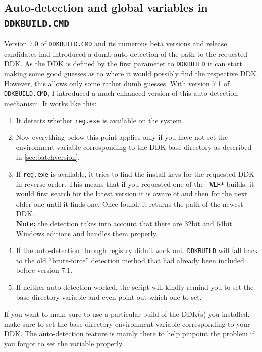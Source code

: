 \documentclass[a4paper,titlepage]{report}
\begin{document}
\subsection{Auto-detection and global variables in \texttt{DDKBUILD.CMD}}
Version 7.0 of \texttt{DDKBUILD.CMD} and its numerous beta versions and release candidates
had introduced a dumb auto-detection of the path to the requested DDK. As the DDK is
defined by the first parameter to \texttt{DDKBUILD} it can start making some good guesses
as to where it would possibly find the respective DDK. However, this allows only some
rather dumb guesses. With version 7.1 of \texttt{DDKBUILD.CMD}, I introduced a much enhanced
version of this auto-detection mechanism. It works like this:
\begin{enumerate}
  \item It detects whether \texttt{reg.exe} is available on the system.
  \item Now everything below this point applies only if you have not set the environment
        variable corresponding to the DDK base directory as described in \autoref{sec:batchversion}.
  \item If \texttt{reg.exe} is available, it tries to find the install keys for the
        requested DDK in reverse order. This means that if you requested one of the \verb+-WLH*+
        builds, it would first search for the latest version it is aware of and then for
        the next older one until it finds one. Once found, it returns the path of the newest DDK.\\
        \textbf{Note:} the detection takes into account that there are 32bit and 64bit Windows
        editions and handles them properly.
  \item If the auto-detection through registry didn't work out, \texttt{DDKBUILD} will fall back
        to the old ``brute-force'' detection method that had already been included before version 7.1.
  \item If neither auto-detection worked, the script will kindly remind you to set the base directory
        variable and even point out which one to set.
\end{enumerate}
If you want to make sure to use a particular build of the DDK(s) you installed, make sure to set the
base directory environment variable corresponding to your DDK. The auto-detection feature is mainly
there to help pinpoint the problem if you forgot to set the variable properly.
\end{document}
